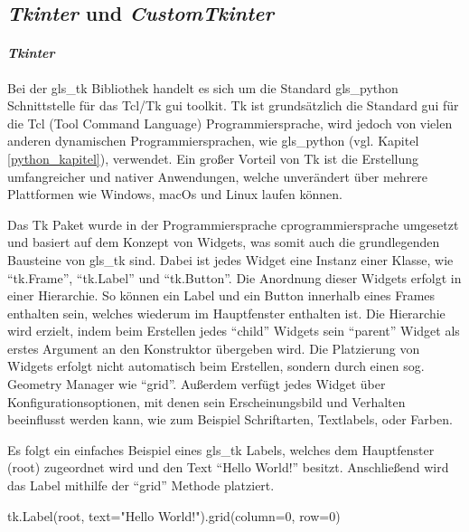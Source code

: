 \subsection{\textit{Tkinter} und \textit{CustomTkinter}}\label{tkinter_kapitel}
\paragraph{\textit{Tkinter}}\label{tk_kapitel}
Bei der \gls{gls_tk} Bibliothek handelt es sich um die Standard \gls{gls_python} Schnittstelle für das Tcl/Tk \ac{gui} toolkit. Tk ist grundsätzlich die Standard \acs{gui} für die Tcl (Tool Command Language) Programmiersprache, wird jedoch von vielen anderen dynamischen Programmiersprachen, wie \zB \gls{gls_python} (vgl. Kapitel \ref{python_kapitel}), verwendet. Ein großer Vorteil von Tk ist die Erstellung umfangreicher und nativer Anwendungen, welche unverändert über mehrere Plattformen wie Windows, macOs und Linux laufen können. \cite[vgl.][]{Python_Software_Foundation_Tk:o.J., Tcl_Developer_Xchange:o.J.}

Das Tk Paket wurde in der Programmiersprache \gls{cprogrammiersprache} umgesetzt und basiert auf dem Konzept von Widgets, was somit auch die grundlegenden Bausteine von \gls{gls_tk} sind. Dabei ist jedes Widget eine Instanz einer Klasse, wie \zB \enquote{tk.Frame}, \enquote{tk.Label} und \enquote{tk.Button}. Die Anordnung dieser Widgets erfolgt in einer Hierarchie. So können \zB ein Label und ein Button innerhalb eines Frames enthalten sein, welches wiederum im Hauptfenster enthalten ist. Die Hierarchie wird erzielt, indem beim Erstellen jedes \enquote{child} Widgets sein \enquote{parent} Widget als erstes Argument an den Konstruktor übergeben wird. Die Platzierung von Widgets erfolgt nicht automatisch beim Erstellen, sondern durch einen sog. Geometry Manager wie \enquote{grid}. Außerdem verfügt jedes Widget über Konfigurationsoptionen, mit denen sein Erscheinungsbild und Verhalten beeinflusst werden kann, wie zum Beispiel Schriftarten, Textlabels, oder Farben. \cite[vgl.][]{Python_Software_Foundation_Tk:o.J., Shipman:2013}

Es folgt ein einfaches Beispiel eines \gls{gls_tk} Labels, welches dem Hauptfenster (root) zugeordnet wird und den Text \enquote{Hello World!} besitzt. Anschließend wird das Label mithilfe der \enquote{grid} Methode platziert. 
\begin{pythoncode}
tk.Label(root, text="Hello World!").grid(column=0, row=0)
\end{pythoncode}


